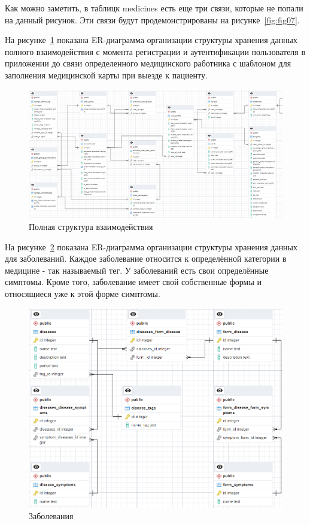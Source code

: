 Как можно заметить, в таблицк medicines есть еще три связи, которые не попали на данный рисунок. Эти связи будут продемонстрированы на рисунке~\ref{fig:fig07}.

На рисунке~\ref{fig:fig04} показана ER-диаграмма организации структуры хранения данных полного взаимодействия с момента регистрации и аутентификации пользователя в приложении до связи определенного медицинского работника с шаблоном для заполнения медицинской карты при выезде к пациенту.

\begin{figure}
  \includegraphics[scale=0.418]{inc/django_user_profile}
  \caption{Полная структура взаимодействия}
  \label{fig:fig04}
\end{figure}

На рисунке~\ref{fig:fig05} показана ER-диаграмма организации структуры хранения данных для заболеваний. Каждое заболевание относится к определённой категории в медицине - так называемый тег. У заболеваний есть свои определённые симптомы. Кроме того, заболевание имеет свой собственные формы и относящиеся уже к этой форме симптомы.

\begin{figure}
  \includegraphics[scale=0.61]{inc/diseases}
  \caption{Заболевания}
  \label{fig:fig05}
\end{figure}

